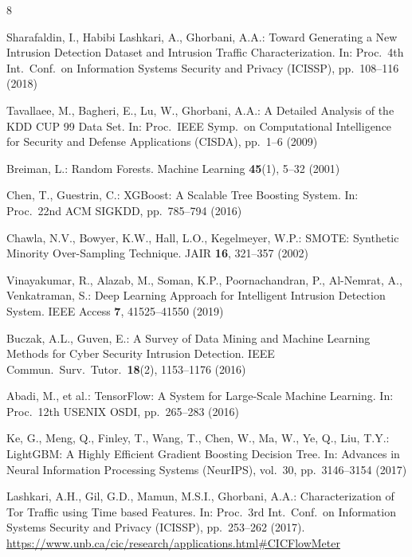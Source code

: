 \documentclass[runningheads]{llncs}
\begin{document}












\clearpage
\begin{thebibliography}{8}

Sharafaldin, I., Habibi Lashkari, A., Ghorbani, A.A.: Toward Generating a New Intrusion Detection Dataset and Intrusion Traffic Characterization. In: Proc.\ 4th Int.\ Conf.\ on Information Systems Security and Privacy (ICISSP), pp.\ 108--116 (2018)

Tavallaee, M., Bagheri, E., Lu, W., Ghorbani, A.A.: A Detailed Analysis of the KDD CUP 99 Data Set. In: Proc.\ IEEE Symp.\ on Computational Intelligence for Security and Defense Applications (CISDA), pp.\ 1--6 (2009)

Breiman, L.: Random Forests. Machine Learning \textbf{45}(1), 5--32 (2001)

Chen, T., Guestrin, C.: XGBoost: A Scalable Tree Boosting System. In: Proc.\ 22nd ACM SIGKDD, pp.\ 785--794 (2016)

Chawla, N.V., Bowyer, K.W., Hall, L.O., Kegelmeyer, W.P.: SMOTE: Synthetic Minority Over-Sampling Technique. JAIR \textbf{16}, 321--357 (2002)

Vinayakumar, R., Alazab, M., Soman, K.P., Poornachandran, P., Al-Nemrat, A., Venkatraman, S.: Deep Learning Approach for Intelligent Intrusion Detection System. IEEE Access \textbf{7}, 41525--41550 (2019)

Buczak, A.L., Guven, E.: A Survey of Data Mining and Machine Learning Methods for Cyber Security Intrusion Detection. IEEE Commun.\ Surv.\ Tutor.\ \textbf{18}(2), 1153--1176 (2016)

Abadi, M., et al.: TensorFlow: A System for Large-Scale Machine Learning. In: Proc.\ 12th USENIX OSDI, pp.\ 265--283 (2016)

Ke, G., Meng, Q., Finley, T., Wang, T., Chen, W., Ma, W., Ye, Q., Liu, T.Y.: LightGBM: A Highly Efficient Gradient Boosting Decision Tree. In: Advances in Neural Information Processing Systems (NeurIPS), vol.\ 30, pp.\ 3146--3154 (2017)

Lashkari, A.H., Gil, G.D., Mamun, M.S.I., Ghorbani, A.A.: Characterization of Tor Traffic using Time based Features. In: Proc.\ 3rd Int.\ Conf.\ on Information Systems Security and Privacy (ICISSP), pp.\ 253--262 (2017). \url{https://www.unb.ca/cic/research/applications.html\#CICFlowMeter}


\end{thebibliography}
\end{document}
